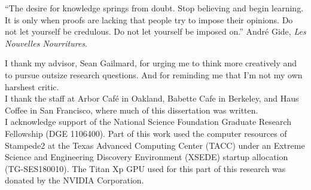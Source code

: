 \documentclass[hidelinks]{ucbthesis}
\begin{document}
\begin{frontmatter}

\begin{dedication}
\null\vfil
\begin{center}
``The desire for knowledge 
	springs from doubt. Stop believing and begin learning. It is 
	only when proofs are lacking that people try to impose their 
	opinions. Do not let yourself be credulous. Do not let yourself 
	be imposed on.'' André Gide, \emph{Les Nouvelles Nourritures}.
\end{center}
\vfil\null
\end{dedication}


\tableofcontents

\begin{acknowledgements}
	
I thank my advisor, Sean Gailmard, for urging me to think more creatively and to pursue outsize research questions. And for reminding me that I'm not my own harshest critic.\\

I thank the staff at Arbor Café in Oakland, Babette Cafe in Berkeley, and Haus Coffee in San Francisco, where much of this dissertation was written.\\

I acknowledge support of the National Science Foundation Graduate Research Fellowship (DGE 1106400). Part of this work used the computer resources of Stampede2 at the Texas Advanced Computing Center (TACC) under an Extreme Science and Engineering Discovery Environment (XSEDE) startup allocation (TG-SES180010). The Titan Xp GPU used for this part of this research was donated by the NVIDIA Corporation.
\end{acknowledgements}

\end{frontmatter}



\printbibliography[title=References]

\appendix
\end{document}
